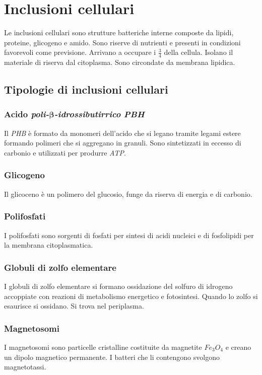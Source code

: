 \section{Inclusioni cellulari}
Le inclusioni cellulari sono strutture batteriche interne composte da lipidi, proteine, glicogeno e amido.
Sono riserve di nutrienti e presenti in condizioni favorevoli come previsione.
Arrivano a occupare i $\frac{3}{4}$ della cellula.
Isolano il materiale di riserva dal citoplasma.
Sono circondate da membrana lipidica.
	
	\subsection{Tipologie di inclusioni cellulari}

		\subsubsection{Acido \emph{poli-$\mathbf{\beta}$-idrossibutirrico} \emph{PBH}}
		Il \emph{PHB} \`e formato da monomeri dell'acido che si legano tramite legami estere formando polimeri che si aggregano in granuli.
		Sono sintetizzati in eccesso di carbonio e utilizzati per produrre \emph{ATP}.
		
		\subsubsection{Glicogeno}
		Il glicoceno \`e un polimero del glucosio, funge da riserva di energia e di carbonio.

		\subsubsection{Polifosfati}
		I polifosfati sono sorgenti di fosfati per sintesi di acidi nucleici e di fosfolipidi per la membrana citoplasmatica.


		\subsubsection{Globuli di zolfo elementare}
		I globuli di zolfo elementare si formano ossidazione del solfuro di idrogeno accoppiate con reazioni di metabolismo energetico e fotosintesi.
		Quando lo zolfo si esaurisce si ossidano.
		Si trova nel periplasma.


		\subsubsection{Magnetosomi}
		I magnetosomi sono particelle cristalline costituite da magnetite \emph{$Fe_3O_4$} e creano un dipolo magnetico permanente.
			I batteri che li contengono svolgono magnetotassi.


